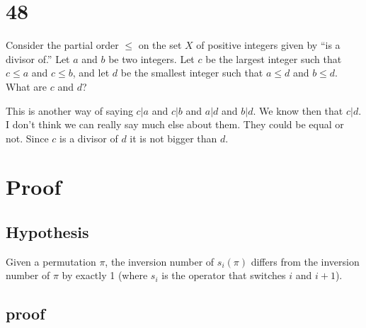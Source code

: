 \documentclass{article}
\begin{document}
\section*{48}
Consider the partial order $\leq$ on the set $X$ of positive integers given by ``is a divisor of.'' Let $a$ and $b$ be two integers. Let $c$ be the largest integer such that $c\leq a$ and $c\leq b$, and let $d$ be the smallest integer such that $a\leq d$ and $b\leq d$. What are $c$ and $d$?

This is another way of saying $c|a$ and $c|b$ and $a|d$ and $b|d$. We know then that $c|d$. I don't think we can really say much else about them. They could be equal or not. Since $c$ is a divisor of $d$ it is not bigger than $d$.
\section*{Proof}
\subsection*{Hypothesis}
Given a permutation $\pi$, the inversion number of $s_i(\pi)$ differs from the inversion number of $\pi$ by exactly 1 (where $s_i$ is the operator that switches $i$ and $i+1$).
\subsection*{proof}
\end{document}
